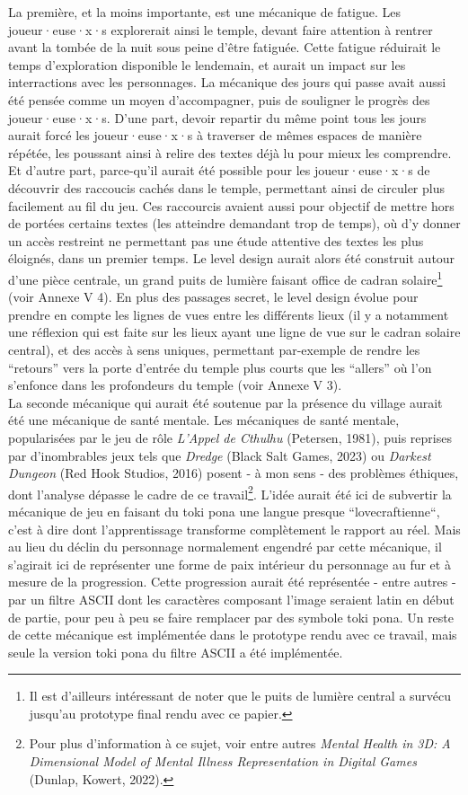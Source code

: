 \documentclass{scrartcl}
\begin{document}
	La première, et la moins importante, est une mécanique de fatigue. Les joueur·euse·x·s explorerait ainsi le temple, devant faire attention à rentrer avant la tombée de la nuit sous peine d'être fatiguée. Cette fatigue réduirait le temps d'exploration disponible le lendemain, et aurait un impact sur les interractions avec les personnages. La mécanique des jours qui passe avait aussi été pensée comme un moyen d'accompagner, puis de souligner le progrès des joueur·euse·x·s. D'une part, devoir repartir du même point tous les jours aurait forcé les joueur·euse·x·s à traverser de mêmes espaces de manière répétée, les poussant ainsi à relire des textes déjà lu pour mieux les comprendre. Et d'autre part, parce-qu'il aurait été possible pour les joueur·euse·x·s de découvrir des raccoucis cachés dans le temple, permettant ainsi de circuler plus facilement au fil du jeu. Ces raccourcis avaient aussi pour objectif de mettre hors de portées certains textes (les atteindre demandant trop de temps), où d'y donner un accès restreint ne permettant pas une étude attentive des textes les plus éloignés, dans un premier temps. Le level design aurait alors été construit autour d'une pièce centrale, un grand puits de lumière faisant office de cadran solaire\footnote{Il est d'ailleurs intéressant de noter que le puits de lumière central a survécu jusqu'au prototype final rendu avec ce papier.} (voir Annexe V 4). En plus des passages secret, le level design évolue pour prendre en compte les lignes de vues entre les différents lieux (il y a notamment une réflexion qui est faite sur les lieux ayant une ligne de vue sur le cadran solaire central), et des accès à sens uniques, permettant par-exemple de rendre les “retours” vers la porte d'entrée du temple plus courts que les “allers” où l'on s'enfonce dans les profondeurs du temple (voir Annexe V 3).\\
	La seconde mécanique qui aurait été soutenue par la présence du village aurait été une mécanique de santé mentale. Les mécaniques de santé mentale, popularisées par le jeu de rôle \textit{L'Appel de Cthulhu} (Petersen, 1981), puis reprises par d'inombrables jeux tels que \textit{Dredge} (Black Salt Games, 2023) ou \textit{Darkest Dungeon} (Red Hook Studios, 2016) posent - à mon sens - des problèmes éthiques, dont l'analyse dépasse le cadre de ce travail\footnote{Pour plus d'information à ce sujet, voir entre autres \textit{Mental Health in 3D: A Dimensional Model of Mental Illness Representation in Digital Games} (Dunlap, Kowert, 2022).}. L'idée aurait été ici de subvertir la mécanique de jeu en faisant du toki pona une langue presque “lovecraftienne“, c'est à dire dont l'apprentissage transforme complètement le rapport au réel. Mais au lieu du déclin du personnage normalement engendré par cette mécanique, il s'agirait ici de représenter une forme de paix intérieur du personnage au fur et à mesure de la progression. Cette progression aurait été représentée - entre autres - par un filtre ASCII dont les caractères composant l'image seraient latin en début de partie, pour peu à peu se faire remplacer par des symbole toki pona. Un reste de cette mécanique est implémentée dans le prototype rendu avec ce travail, mais seule la version toki pona du filtre ASCII a été implémentée.\\
\end{document}
